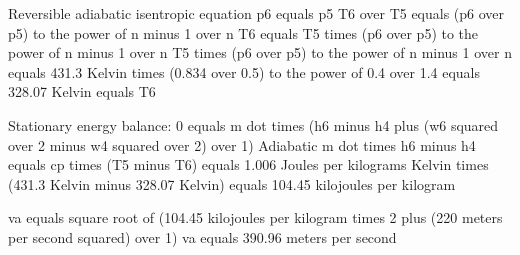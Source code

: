 Reversible adiabatic isentropic equation  
p6 equals p5  
T6 over T5 equals (p6 over p5) to the power of n minus 1 over n  
T6 equals T5 times (p6 over p5) to the power of n minus 1 over n  
T5 times (p6 over p5) to the power of n minus 1 over n equals 431.3 Kelvin times (0.834 over 0.5) to the power of 0.4 over 1.4 equals 328.07 Kelvin equals T6  

Stationary energy balance:  
0 equals m dot times (h6 minus h4 plus (w6 squared over 2 minus w4 squared over 2) over 1)  
Adiabatic m dot times h6 minus h4 equals cp times (T5 minus T6) equals 1.006 Joules per kilograms Kelvin times (431.3 Kelvin minus 328.07 Kelvin) equals 104.45 kilojoules per kilogram  

va equals square root of (104.45 kilojoules per kilogram times 2 plus (220 meters per second squared) over 1)  
va equals 390.96 meters per second